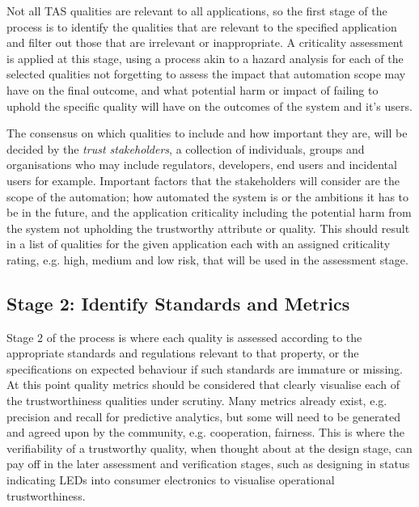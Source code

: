 Not all TAS qualities are relevant to all applications, so the first stage of the process is to identify the qualities that are relevant to the specified application and filter out those that are irrelevant or inappropriate. 
%
A criticality assessment is applied at this stage, using a process akin to a hazard analysis for each of the selected qualities not forgetting to assess the impact that automation scope may have on the final outcome, and what potential harm or impact of failing to uphold the specific quality will have on the outcomes of the system and it's users. 

The consensus on which qualities to include and how important they are, will be decided by the \emph{trust stakeholders}, a collection of individuals, groups and organisations who may include regulators, developers, end users and incidental users for example. 
%
Important factors that the stakeholders will consider are the scope of the automation; how automated the system is or the ambitions it has to be in the future, and the application criticality including the potential harm from the system not upholding the trustworthy attribute or quality. 
%
This should result in a list of qualities for the given application each with an assigned criticality rating, e.g. high, medium and low risk, that will be used in the assessment stage. 


\subsection{Stage 2: Identify Standards and Metrics}

Stage 2 of the process is where each quality is assessed according to the appropriate standards and regulations relevant to that property, or the specifications on expected behaviour if such standards are immature or missing. 
%
At this point quality metrics should be considered that clearly visualise each of the trustworthiness qualities under scrutiny. 
%
Many metrics already exist, e.g. precision and recall for predictive analytics, but some will need to be generated and agreed upon by the community, e.g. cooperation, fairness. 
%
This is where the verifiability of a trustworthy quality, when thought about at the design stage, can pay off in the later assessment and verification stages, such as designing in status indicating LEDs into consumer electronics to visualise operational trustworthiness. 



